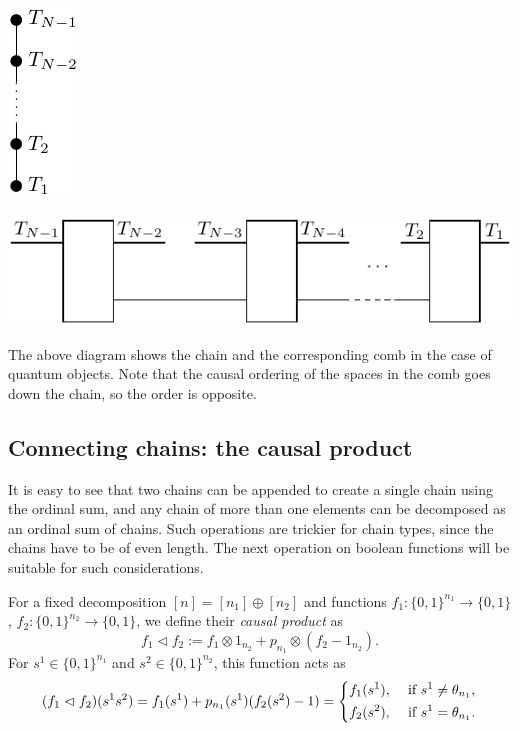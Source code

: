 \documentclass[12pt]{article}
\theoremstyle{definition}
\theoremstyle{remark}
\def\vtl{\vartriangleleft}
\begin{document}
\medskip
\begin{center}
\begin{minipage}[c]{0.3\textwidth}
\centering
\includegraphics[scale=0.8]{chain3.pdf}
\end{minipage}
\begin{minipage}[c]{0.5\textwidth}
\centering
\includegraphics[scale=0.9]{general_comb_T.t1.pdf}
\end{minipage}
\end{center}

\medskip


The above diagram shows the chain and the corresponding comb in the case of quantum
objects. Note that the causal ordering of the spaces in the comb goes down the chain, so
the order is opposite.


\subsection{Connecting chains: the causal product}



It is easy to see that two chains can be appended to create a single chain using the
ordinal sum, and any chain
of more than one elements can be decomposed as an ordinal sum of  chains. Such operations are trickier for
chain types, since the chains have to be of even length. The next operation on boolean
functions will be suitable for such considerations. 
 
For a fixed decomposition $[n]=[n_1]\oplus[n_2]$ and functions
$f_1:\{0,1\}^{n_1}\to \{0,1\}$, $f_2:\{0,1\}^{n_2}\to \{0,1\}$, we define their {\em
causal product} as 
\[
f_1\vartriangleleft f_2:=f_1\otimes 1_{n_2}+p_{n_1}\otimes (f_2-1_{n_2}).
\]
For  $s^1\in \{0,1\}^{n_1}$ and $s^2\in \{0,1\}^{n_2}$, this function acts as
\begin{equation}\label{eq:causal_product}
(f_1\vtl f_2)(s^1s^2)= f_1(s^1)+p_{n_1}(s^1)(f_2(s^2)-1)=\begin{dcases} f_1(s^1), &
\text{ if } s^1\ne \theta_{n_1},\\
   f_2(s^2), & \text{ if } s^1=\theta_{n_1}.
   \end{dcases}
\end{equation}
\end{document}
